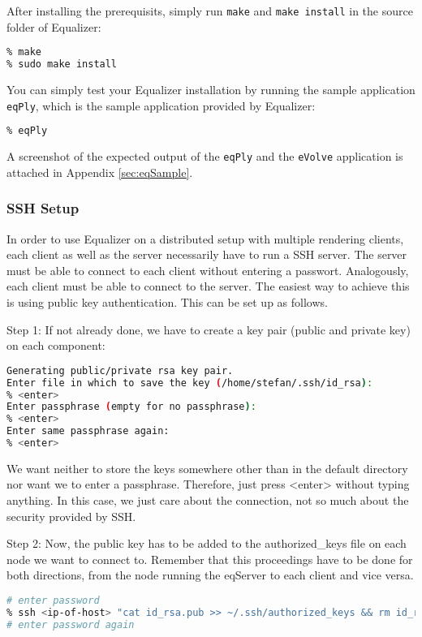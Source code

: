 After installing the prerequisits, simply run \texttt{make} and \texttt{make install} in the source folder of Equalizer: 

\begin{lstlisting}[language=bash,caption={Equalizer installation}]
% cd ~/crf/equalizer-0.6-rc1/
% make
% sudo make install
\end{lstlisting}

You can simply test your Equalizer installation by running the sample application \texttt{eqPly}, which is the sample application provided by Equalizer:

\begin{lstlisting}[language=bash,caption={Test Equalizer by example application eqPly}]
% cd /usr/local/bin
% eqPly
\end{lstlisting}

A screenshot of the expected output of the \texttt{eqPly} and the \texttt{eVolve} application is attached in Appendix \ref{sec:eqSample}.

\subsubsection{SSH Setup}
In order to use Equalizer on a distributed setup with multiple rendering clients, each client as well as the server necessarily have to run a SSH server. The server must be able to connect to each client without entering a passwort. Analogously, each client must be able to connect to the server. The easiest way to achieve this is using public key authentication. This can be set up as follows.

Step 1: If not already done, we have to create a key pair (public and private key) on each component:
\begin{lstlisting}[language=bash,caption={SSH Key generation}]
% ssh-keygen
Generating public/private rsa key pair.
Enter file in which to save the key (/home/stefan/.ssh/id_rsa):
% <enter>
Enter passphrase (empty for no passphrase):
% <enter>
Enter same passphrase again:
% <enter>
\end{lstlisting}
We want neither to store the keys somewhere other than in the default directory nor want we to enter a passphrase. Therefore, just press <enter> without typing anything. In this case, we just care about the connection, not so much about the security provided by SSH.

Step 2: Now, the public key has to be added to the authorized\_keys file on each node we want to connect to. Remember that this proceedings have to be done for both directions, from the node running the eqServer to each client and vice versa.
\begin{lstlisting}[language=bash,caption={RSA-Key distribution}]
% scp ~/.ssh/id_rsa.pub <ip-of-host>:/home/<username>
# enter password
% ssh <ip-of-host> "cat id_rsa.pub >> ~/.ssh/authorized_keys && rm id_rsa.pub"
# enter password again
\end{lstlisting}

